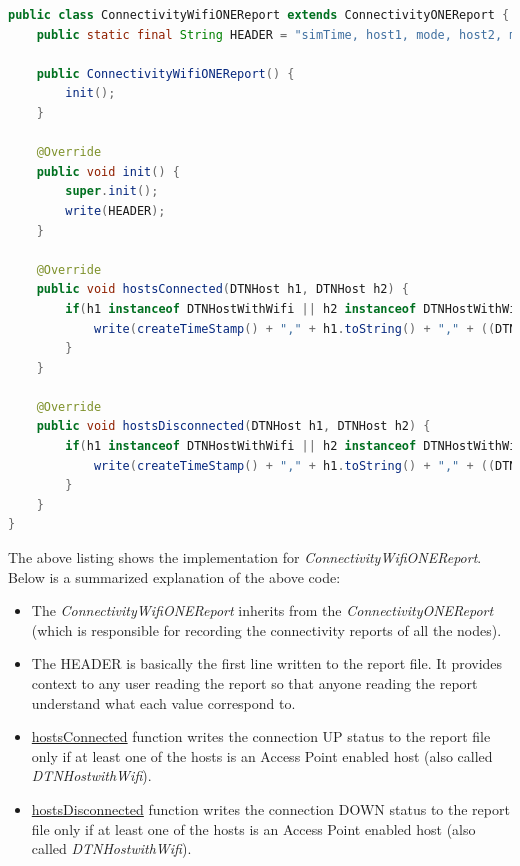 \begin{lstlisting}[language=java]
public class ConnectivityWifiONEReport extends ConnectivityONEReport {
	public static final String HEADER = "simTime, host1, mode, host2, mode, up/down";

	public ConnectivityWifiONEReport() {
		init();
	}

	@Override
	public void init() {
		super.init();
		write(HEADER);
	}

	@Override
	public void hostsConnected(DTNHost h1, DTNHost h2) {
		if(h1 instanceof DTNHostWithWifi || h2 instanceof DTNHostWithWifi) {
			write(createTimeStamp() + "," + h1.toString() + "," + ((DTNHostWithWifi)h1).getModeName() + "," + h2.toString() + "," + ((DTNHostWithWifi)h2).getModeName() + "," + "UP");
		}
	}

	@Override
	public void hostsDisconnected(DTNHost h1, DTNHost h2) {
		if(h1 instanceof DTNHostWithWifi || h2 instanceof DTNHostWithWifi) {
			write(createTimeStamp() + "," + h1.toString() + "," + ((DTNHostWithWifi)h1).getModeName() + "," + h2.toString() + "," + ((DTNHostWithWifi)h2).getModeName() + "," + "DOWN");
		}
	}
}
\end{lstlisting}
\vspace{5mm}
The above listing shows the implementation for \textit{ConnectivityWifiONEReport}. Below is a summarized explanation of the above code:
\begin{itemize}
	\item The \textit{ConnectivityWifiONEReport} inherits from the \textit{ConnectivityONEReport} (which is responsible for recording the connectivity reports of all the nodes).
	\item The HEADER is basically the first line written to the report file. It provides context to any user reading the report so that anyone reading the report understand what each value correspond to.
	\item \underline{hostsConnected} function writes the connection UP status to the report file only if at least one of the hosts is an Access Point enabled host (also called \textit{DTNHostwithWifi}).
	\item \underline{hostsDisconnected} function writes the connection DOWN status to the report file only if at least one of the hosts is an Access Point enabled host (also called \textit{DTNHostwithWifi}).
\end{itemize}

